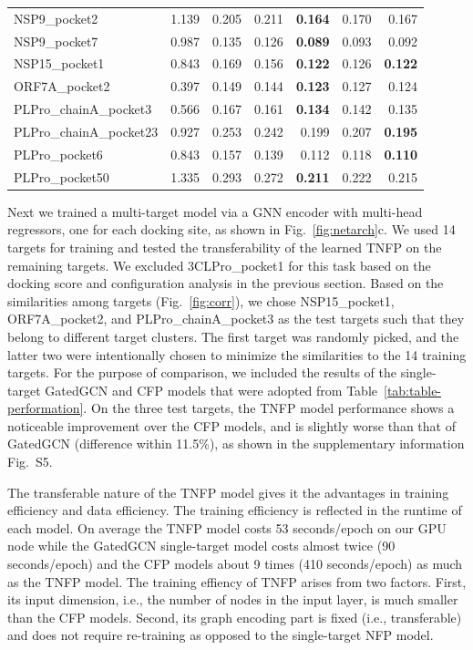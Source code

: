 \documentclass[conference]{IEEEtran}
\begin{document}
\begin{table}[htb]
\begin{center}
\begin{tabular}{l|r|rr|rrr}
          NSP9\_pocket2 &     1.139 &  0.205 &   0.211 &\bf{0.164} &      0.170 &  0.167 \\
          NSP9\_pocket7 &     0.987 &  0.135 &   0.126 &\bf{0.089} &      0.093 &  0.092 \\
         NSP15\_pocket1 &     0.843 &  0.169 &   0.156 &\bf{0.122} &      0.126 &\bf{0.122} \\
         ORF7A\_pocket2 &     0.397 &  0.149 &   0.144 &\bf{0.123} &      0.127 &  0.124 \\
  PLPro\_chainA\_pocket3 &     0.566 &  0.167 &   0.161 &\bf{0.134} &      0.142 &  0.135 \\
 PLPro\_chainA\_pocket23 &     0.927 &  0.253 &   0.242 &     0.199 &      0.207 &\bf{0.195} \\
         PLPro\_pocket6 &     0.843 &  0.157 &   0.139 &     0.112 &      0.118 &\bf{0.110} \\
        PLPro\_pocket50 &     1.335 &  0.293 &   0.272 &\bf{0.211} &      0.222 &  0.215 \\
\bottomrule
\end{tabular}
\end{center}
\end{table}
Next we trained a multi-target model via a GNN encoder with multi-head regressors, one for each docking site, as shown in Fig.~\ref{fig:netarch}c. We used 14 targets for training and tested the transferability of the learned TNFP on the remaining targets. We excluded 3CLPro\_pocket1 for this task based on the docking score and configuration analysis in the previous section. Based on the similarities among targets (Fig.~\ref{fig:corr}), we chose NSP15\_pocket1, ORF7A\_pocket2, and PLPro\_chainA\_pocket3 as the test targets such that they belong to different target clusters. The first target was randomly picked, and the latter two were intentionally chosen to minimize the similarities to the 14 training targets. For the purpose of comparison, we included the results of the single-target GatedGCN and CFP models that were adopted from Table~\ref{tab:table-performation}. On the three test targets, the TNFP model performance shows a noticeable improvement over the CFP models, and is slightly worse than that of GatedGCN (difference within 11.5\%), as shown in the supplementary information Fig.~S5.

The transferable nature of the TNFP model gives it the advantages in training efficiency and data efficiency. The training efficiency is reflected in the runtime of each model. On average the TNFP model costs 53 seconds/epoch on our GPU node while the GatedGCN single-target model costs almost twice (90 seconds/epoch) and the CFP models about 9 times (410 seconds/epoch) as much as the TNFP model. The training effiency of TNFP arises from two factors. First, its input dimension, i.e., the number of nodes in the input layer, is much smaller than the CFP models. Second, its graph encoding part is fixed (i.e., transferable) and does not require re-training as opposed to the single-target NFP model.
\end{document}

